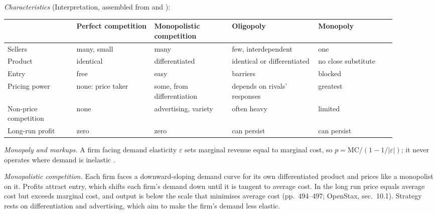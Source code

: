 \begin{qfdefinition}\label{def:market-structures-pricing}
 \emph{Characteristics} (Interpretation, assembled from \citep[chaps.~23--28]{varian-microeconomics-2014} and \citep[chap.~10]{openstax-microeconomics-3e}):
\begin{center}\small
\begin{tabular}{@{}p{0.16\linewidth}p{0.18\linewidth}p{0.18\linewidth}p{0.2\linewidth}p{0.18\linewidth}@{}}
\toprule
 & Perfect competition & Monopolistic competition & Oligopoly & Monopoly \\
\midrule
Sellers & many, small & many & few, interdependent & one \\
Product & identical & differentiated & identical or differentiated & no close substitute \\
Entry & free & easy & barriers & blocked \\
Pricing power & none: price taker & some, from differentiation & depends on rivals' responses & greatest \\
Non-price competition & none & advertising, variety & often heavy & limited \\
Long-run profit & zero & zero & can persist & can persist \\
\bottomrule
\end{tabular}
\end{center}

\emph{Monopoly and markups.} A firm facing demand elasticity $\varepsilon$ sets marginal revenue equal to marginal cost, so $p=\mathrm{MC}/(1-1/|\varepsilon|)$; it never operates where demand is inelastic \citep[pp.~458--461]{varian-microeconomics-2014}.

\emph{Monopolistic competition.} Each firm faces a downward-sloping demand curve for its own differentiated product and prices like a monopolist on it. Profits attract entry, which shifts each firm's demand down until it is tangent to average cost. In the long run price equals average cost but exceeds marginal cost, and output is below the scale that minimises average cost (pp.~494--497; OpenStax, sec.~10.1). Strategy rests on differentiation and advertising, which aim to make the firm's demand less elastic.


\end{qfdefinition}
